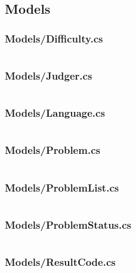 \documentclass[a4paper]{report}
\begin{document}
\subsection{Models}

\subsubsection{Models/Difficulty.cs}

\inputminted{csharp}{"../src/Algorithm Dynamics.Core/Difficulty.cs"}

\subsubsection{Models/Judger.cs}

\inputminted{csharp}{"../src/Algorithm Dynamics.Core/Judger.cs"}

\subsubsection{Models/Language.cs}

\inputminted{csharp}{"../src/Algorithm Dynamics.Core/Language.cs"}

\subsubsection{Models/Problem.cs}

\inputminted{csharp}{"../src/Algorithm Dynamics.Core/Problem.cs"}

\subsubsection{Models/ProblemList.cs}

\inputminted{csharp}{"../src/Algorithm Dynamics.Core/ProblemList.cs"}

\subsubsection{Models/ProblemStatus.cs}

\inputminted{csharp}{"../src/Algorithm Dynamics.Core/ProblemStatus.cs"}

\subsubsection{Models/ResultCode.cs}

\inputminted{csharp}{"../src/Algorithm Dynamics.Core/ResultCode.cs"}
\end{document}
